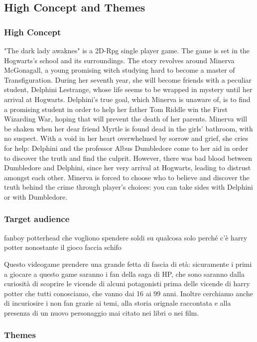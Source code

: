\subsection{High Concept and Themes}

\subsubsection{High Concept}

"The dark lady awaknes" is a 2D-Rpg single player game. The game is set in the Hogwarts's school and its surroundings. The story revolves around Minerva McGonagall, a young promising witch studying hard to become a master of Transfiguration. During her seventh year, she will become friends with a peculiar student, Delphini Lestrange, whose life seems to be wrapped in mystery until her arrival at Hogwarts. Delphini's true goal, which Minerva is unaware of, is to find a promising student in order to help her father Tom Riddle win the First Wizarding War, hoping that will prevent the death of her parents.
Minerva will be shaken when her dear friend Myrtle is found dead in the girls' bathroom, with no suspect. With a void in her heart overwhelmed by sorrow and grief, she cries for help: Delphini and the professor Albus Dumbledore come to her aid in order to discover the truth and find the culprit. However, there was bad blood between Dumbledore and Delphini, since her very arrival at Hogwarts, leading to distrust amongst each other.
Minerva is forced to choose who to believe and discover the truth behind the crime through player's choices: you can take sides with Delphini or with Dumbledore.

\subsubsection{Target audience}
fanboy potterhead che vogliono spendere soldi su qualcosa solo perché c'è harry potter nonostante il gioco faccia schifo

Questo videogame prendere una grande fetta di fascia di età: sicuramente i primi a giocare a questo game saranno i fan della saga di HP, che sono saranno dalla curiosità di scoprire le vicende di alcuni potagonisti prima delle vicende di harry potter che tutti conosciamo, che vanno dai 16 ai 99 anni. Inoltre cerchiamo anche di incuriosire i non fan grazie ai temi, alla storia orignale raccontata e alla presenza di un nuovo personaggio mai citato nei libri o nei film.

\subsubsection{Themes}

